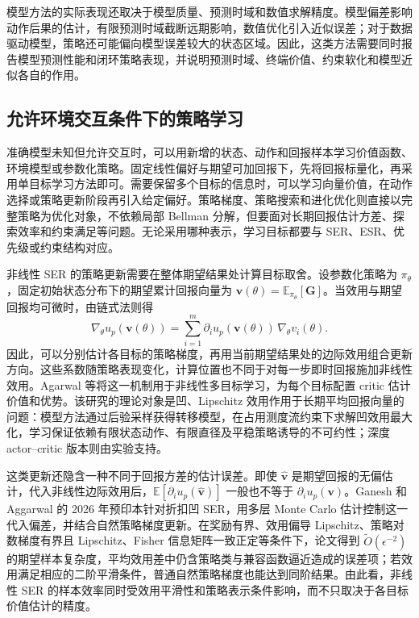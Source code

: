 模型方法的实际表现还取决于模型质量、预测时域和数值求解精度。模型偏差影响动作后果的估计，有限预测时域截断远期影响，数值优化引入近似误差；对于数据驱动模型，策略还可能偏向模型误差较大的状态区域。因此，这类方法需要同时报告模型预测性能和闭环策略表现，并说明预测时域、终端价值、约束软化和模型近似各自的作用。

\subsection{允许环境交互条件下的策略学习}\label{sec:solving-online}

准确模型未知但允许交互时，可以用新增的状态、动作和回报样本学习价值函数、环境模型或参数化策略。固定线性偏好与期望可加回报下，先将回报标量化，再采用单目标学习方法即可。需要保留多个目标的信息时，可以学习向量价值，在动作选择或策略更新阶段再引入给定偏好。策略梯度、策略搜索和进化优化则直接以完整策略为优化对象，不依赖局部 Bellman 分解，但要面对长期回报估计方差、探索效率和约束满足等问题\cite{hayes2022}。无论采用哪种表示，学习目标都要与 SER、ESR、优先级或约束结构对应。

非线性 SER 的策略更新需要在整体期望结果处计算目标取舍。设参数化策略为 $\pi_\theta$，固定初始状态分布下的期望累计回报向量为 $\mathbf v(\theta)=\mathbb E_{\pi_\theta}[\mathbf G]$。当效用与期望回报均可微时，由链式法则得
\begin{equation}
\nabla_\theta u_p(\mathbf v(\theta))
=\sum_{i=1}^{m}
\partial_i u_p(\mathbf v(\theta))\,
\nabla_\theta v_i(\theta).
\end{equation}
因此，可以分别估计各目标的策略梯度，再用当前期望结果处的边际效用组合更新方向。这些系数随策略表现变化，计算位置也不同于对每一步即时回报施加非线性效用。Agarwal 等将这一机制用于非线性多目标学习，为每个目标配置 critic 估计价值和优势\cite{agarwal2022nonlinear}。该研究的理论对象是凹、Lipschitz 效用作用于长期平均回报向量的问题：模型方法通过后验采样获得转移模型，在占用测度流约束下求解凹效用最大化，学习保证依赖有限状态动作、有限直径及平稳策略诱导的不可约性；深度 actor--critic 版本则由实验支持。

这类更新还隐含一种不同于回报方差的估计误差。即使 $\widehat{\mathbf v}$ 是期望回报的无偏估计，代入非线性边际效用后，$\mathbb E[\partial_i u_p(\widehat{\mathbf v})]$ 一般也不等于 $\partial_i u_p(\mathbf v)$。Ganesh 和 Aggarwal 的 2026 年预印本针对折扣凹 SER，用多层 Monte Carlo 估计控制这一代入偏差，并结合自然策略梯度更新\cite{ganesh2026bias}。在奖励有界、效用偏导 Lipschitz、策略对数梯度有界且 Lipschitz、Fisher 信息矩阵一致正定等条件下，论文得到 $\widetilde O(\epsilon^{-2})$ 的期望样本复杂度，平均效用差中仍含策略类与兼容函数逼近造成的误差项；若效用满足相应的二阶平滑条件，普通自然策略梯度也能达到同阶结果。由此看，非线性 SER 的样本效率同时受效用平滑性和策略表示条件影响，而不只取决于各目标价值估计的精度。

